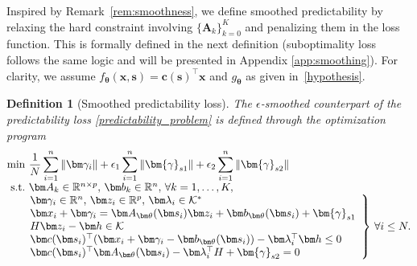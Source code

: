 \documentclass{article}
\def\bgamma{\bm{\gamma}}
\theoremstyle{plain}
\newtheorem{definition}[theorem]{Definition}
\begin{document}
Inspired by Remark~\ref{rem:smoothness}, we define smoothed predictability by relaxing the hard constraint involving $\{\bm A_k\}_{k=0}^K$ and penalizing them in the loss function. This is formally defined in the next definition (suboptimality loss follows the same logic and will be presented in Appendix \ref{app:smoothing}). For clarity, we assume $f_{\bm\theta}(\bm x, \bm s) = \bm c(\bm s)^\top \bm x$ and $g_{\bm\theta}$ as given in~\eqref{hypothesis}. 

\begin{definition}[Smoothed predictability loss] 
The $\epsilon$-smoothed counterpart of the predictability loss   \eqref{predictability_problem}   is defined through the optimization program 
\begin{equation}\label{smoothed_formulation}
    \begin{array}{@{}r@{~}l@{}ll}
    \min   & \displaystyle\frac{1}{N} \sum_{i = 1}^n \|\bm \gamma_{i}\| + \epsilon_1 \sum_{i=1}^n \|\bgamma_{s1}\| + \epsilon_2 \sum_{i=1}^n \|\bgamma_{s2}\| \\
    {\rm s.t.}      &\bm A_k\in\mathbb{R}^{n\times p},\, \bm b_k\in\mathbb{R}^{n},\, \forall k=1,\ldots,K,\\
    &\left.
    \!\!\!\begin{array}{l}
     \bm\gamma_i\in\mathbb{R}^n,\,\bm z_i\in\mathbb{R}^p,\, \bm \lambda_i \in \mathcal K^*\\
    \bm x_i + \bm \gamma_{i} = \bm A_{\bm\theta}(\bm s_i)\bm z_i + \bm b_{\bm\theta}(\bm s_i) + \bgamma_{s1}\\
     H\bm z_i - \bm h \in \mathcal{K}\\
     \bm c(\bm s_i)^\top(\bm x_i+\bm\gamma_{i}-\bm b_{\bm\theta}(\bm s_i)) - \bm \lambda_i^\top \bm h \leq 0\\
     \bm c(\bm s_i)^\top\bm A_{\bm\theta}(\bm s_i) - \bm \lambda_i^\top H + \bgamma_{s2} = 0 \\
     \end{array}
    \right\} \, \forall i\leq N.
    \end{array}
\end{equation}
\end{definition}
\end{document}
